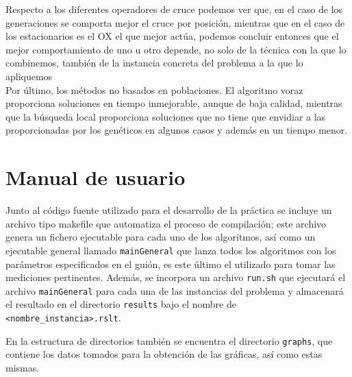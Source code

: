 \documentclass[11pt,a4paper]{article}
\begin{document}
	\noindent Respecto a los diferentes operadores de cruce podemos ver que, en el caso de los generaciones se comporta mejor el cruce por posición, mientras que en el caso de los estacionarios es el OX el que mejor actúa, podemos concluir entonces que el mejor comportamiento de uno u otro depende, no solo de la técnica con la que lo combinemos, también de la instancia concreta del problema a la que lo apliquemos\\
	
	\noindent Por último, los métodos no basados en poblaciones. El algoritmo voraz proporciona soluciones en tiempo inmejorable, aunque de baja calidad, mientras que la búsqueda local proporciona soluciones que no tiene que envidiar a las proporcionadas por los genéticos en algunos casos y además en un tiempo menor.
	
\section{Manual de usuario}

	\noindent Junto al código fuente utilizado para el desarrollo de la práctica se incluye un archivo tipo makefile que automatiza el proceso de compilación; este archivo genera un fichero ejecutable para cada uno de los algoritmos, así como un ejecutable general llamado \texttt{mainGeneral} que lanza todos los algoritmos con los parámetros especificados en el guión, es este último el utilizado para tomar las mediciones pertinentes. Además, se incorpora un archivo \texttt{run.sh} que ejecutará el archivo \texttt{mainGeneral} para cada una de las instancias del problema y almacenará el resultado en el directorio \texttt{results} bajo el nombre de \texttt{<nombre\_instancia>.rslt}.
	
	\noindent En la estructura de directorios también se encuentra el directorio \texttt{graphs}, que contiene los datos tomados para la obtención de las gráficas, así como estas mismas.
	
\end{document}
